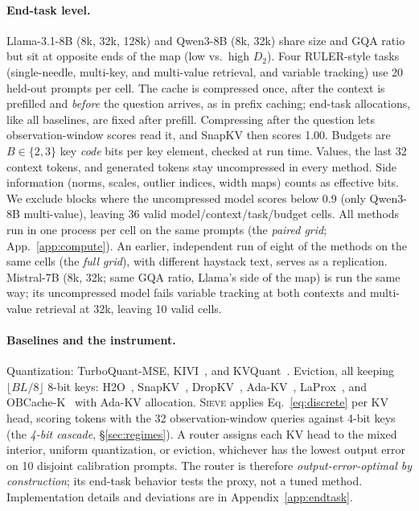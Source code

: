 \documentclass{article}
\newcommand{\sieve}{\textsc{Sieve}}
\theoremstyle{definition}
\begin{document}
\paragraph{End-task level.}
Llama-3.1-8B (8k, 32k, 128k) and Qwen3-8B (8k, 32k) share size and GQA ratio but sit at opposite ends of the map (low vs.\ high $D_2$).  Four RULER-style tasks~\citep{hsieh2024ruler} (single-needle, multi-key, and multi-value retrieval, and variable tracking) use 20 held-out prompts per cell.  The cache is compressed once, after the context is prefilled and \emph{before} the question arrives, as in prefix caching; end-task allocations, like all baselines, are fixed after prefill.  Compressing after the question lets observation-window scores read it, and SnapKV then scores 1.00.  Budgets are $B\in\{2,3\}$ key \emph{code} bits per key element, checked at run time.  Values, the last 32 context tokens, and generated tokens stay uncompressed in every method.  Side information (norms, scales, outlier indices, width maps) counts as effective bits.  We exclude blocks where the uncompressed model scores below 0.9 (only Qwen3-8B multi-value), leaving 36 valid model/context/task/budget cells.  All methods run in one process per cell on the same prompts (the \emph{paired grid}; App.~\ref{app:compute}).  An earlier, independent run of eight of the methods on the same cells (the \emph{full grid}), with different haystack text, serves as a replication.  Mistral-7B (8k, 32k; same GQA ratio, Llama's side of the map) is run the same way; its uncompressed model fails variable tracking at both contexts and multi-value retrieval at 32k, leaving 10 valid cells.

\paragraph{Baselines and the instrument.}
Quantization: TurboQuant-MSE, KIVI~\citep{liu2024kivi}, and KVQuant~\citep{hooper2024kvquant}.  Eviction, all keeping $\lfloor BL/8\rfloor$ 8-bit keys: H2O~\citep{zhang2023h2o}, SnapKV~\citep{li2024snapkv}, DropKV~\citep{zhang2026dropkv}, Ada-KV~\citep{feng2024adakv}, LaProx~\citep{mai2026laprox}, and OBCache-K~\citep{gu2026obcache} with Ada-KV allocation.  \sieve{} applies Eq.~\ref{eq:discrete} per KV head, scoring tokens with the 32 observation-window queries against 4-bit keys (the \emph{4-bit cascade}, \S\ref{sec:regimes}).  A router assigns each KV head to the mixed interior, uniform quantization, or eviction, whichever has the lowest output error on 10 disjoint calibration prompts.  The router is therefore \emph{output-error-optimal by construction}; its end-task behavior tests the proxy, not a tuned method.  Implementation details and deviations are in Appendix~\ref{app:endtask}.
\end{document}
